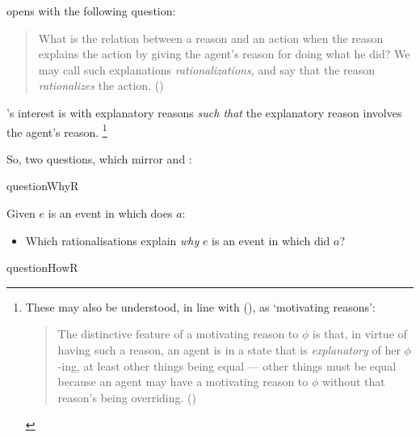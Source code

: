 \begin{note}
  \citeauthor{Davidson:1963aa} opens  with the following question:
  \begin{quote}
    What is the relation between a reason and an action when the reason explains the action by giving the agent's reason for doing what he did?
    We may call such explanations \emph{rationalizations}, and say that the reason \emph{rationalizes} the action.%
    \mbox{}\hfill\mbox{(\citeyear[685]{Davidson:1963aa})}
  \end{quote}
  \citeauthor{Davidson:1963aa}'s interest is with explanatory reasons \emph{such that} the explanatory reason involves the agent's reason.%
  \footnote{
    These may also be understood, in line with \citeauthor{Smith:1994wo} (\citeyear{Smith:1994wo}), as `motivating reasons':
    \begin{quote}
      The distinctive feature of a motivating reason to \(\phi\) is that, in virtue of having such a reason, an agent is in a state that is \emph{explanatory} of her \(\phi\)-ing, at least other things being equal --- other things must be equal because an agent may have a motivating reason to \(\phi\) without that reason's being overriding.%
      \mbox{}\hfill\mbox{(\citeyear[96]{Smith:1994wo})}
    \end{quote}
  }

  So, two questions, which mirror \qWhy{} and \qHow{}:

  \begin{question}{questionWhyR}{\qWhyR{}}
    \medskip

    Given \(e\) is an event in which \vAgent{} does \(a\):

    \begin{itemize}
    \item
      Which rationalisations explain \emph{why} \(e\) is an event in which \vAgent{} did \(a\)?
    \end{itemize}
    \vspace{-1.5\baselineskip}
  \end{question}

    \begin{question}{questionHowR}{\qHowR{}}
    \medskip


\end{question}
\end{note}
